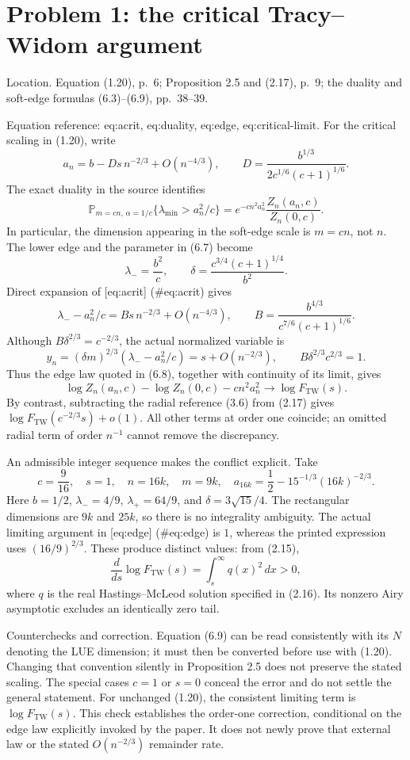 \documentclass[10pt]{article}
\begin{document}
\section*{Problem 1: the critical Tracy–Widom argument}
Location. Equation (1.20), p. 6; Proposition 2.5 and (2.17), p. 9; the duality and soft-edge formulas (6.3)–(6.9), pp. 38–39.\par
Equation reference: eq:acrit, eq:duality, eq:edge, eq:critical-limit. For the critical scaling in (1.20), write \[
 a_n=b-Ds\,n^{-2/3}+O(n^{-4/3}),\qquad
 D=\frac{b^{1/3}}{2c^{1/6}(c+1)^{1/6}} .\] The exact duality in the source identifies \[
 \mathbb P_{m=cn,\,\alpha=1/c}
 \{\lambda_{\min}>a_n^2/c\}
 =e^{-cn^2a_n^2}\frac{Z_n(a_n,c)}{Z_n(0,c)} .\] In particular, the dimension appearing in the soft-edge scale is \(m=cn\), not \(n\). The lower edge and the parameter in (6.7) become \[\lambda_-=\frac{b^2}{c},\qquad
 \delta=\frac{c^{3/4}(c+1)^{1/4}}{b^2}.\] Direct expansion of [eq:acrit] (\#eq:acrit) gives \[\lambda_--a_n^2/c
 =B s\,n^{-2/3}+O(n^{-4/3}),\qquad
 B=\frac{b^{4/3}}{c^{7/6}(c+1)^{1/6}} .\] Although \(B\delta^{2/3}=c^{-2/3}\), the actual normalized variable is \[
 y_n=(\delta m)^{2/3}(\lambda_--a_n^2/c)
     =s+O(n^{-2/3}),
 \qquad B\delta^{2/3}c^{2/3}=1 .\] Thus the edge law quoted in (6.8), together with continuity of its limit, gives \[
 \log Z_n(a_n,c)-\log Z_n(0,c)-cn^2a_n^2
 \longrightarrow \log F_{\mathrm{TW}}(s).\] By contrast, subtracting the radial reference (3.6) from (2.17) gives \(\log F_{\mathrm{TW}}(c^{-2/3}s)+o(1)\). All other terms at order one coincide; an omitted radial term of order \(n^{-1}\) cannot remove the discrepancy.\par
An admissible integer sequence makes the conflict explicit. Take \[c=\frac9{16},\quad s=1,\quad n=16k,\quad m=9k,\quad
 a_{16k}=\frac12-15^{-1/3}(16k)^{-2/3}.\] Here \(b=1/2\), \(\lambda_-=4/9\), \(\lambda_+=64/9\), and \(\delta=3\sqrt{15}/4\). The rectangular dimensions are \(9k\) and \(25k\), so there is no integrality ambiguity. The actual limiting argument in [eq:edge] (\#eq:edge) is \(1\), whereas the printed expression uses \((16/9)^{2/3}\). These produce distinct values: from (2.15), \[\frac{d}{ds}\log F_{\mathrm{TW}}(s)=\int_s^\infty q(x)^2\,dx>0,\] where \(q\) is the real Hastings–McLeod solution specified in (2.16). Its nonzero Airy asymptotic excludes an identically zero tail.\par
Counterchecks and correction. Equation (6.9) can be read consistently with its \(N\) denoting the LUE dimension; it must then be converted before use with (1.20). Changing that convention silently in Proposition 2.5 does not preserve the stated scaling. The special cases \(c=1\) or \(s=0\) conceal the error and do not settle the general statement. For unchanged (1.20), the consistent limiting term is \(\log F_{\mathrm{TW}}(s)\). This check establishes the order-one correction, conditional on the edge law explicitly invoked by the paper. It does not newly prove that external law or the stated \(O(n^{-2/3})\) remainder rate.\par
\end{document}
